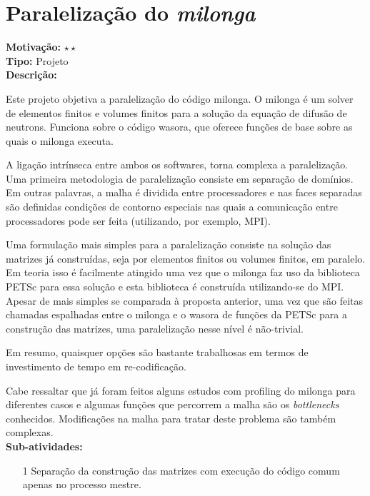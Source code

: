 \chapter{Paralelização do \textit{milonga}}

\textbf{Motivação:} $\star\star$\\

\textbf{Tipo:} Projeto\\

\textbf{Descrição:}

Este projeto objetiva a paralelização do código milonga. O milonga é um solver 
de elementos finitos e volumes finitos para a solução da equação de difusão de 
neutrons. Funciona sobre o código wasora, que oferece funções de base sobre as 
quais o milonga executa.

A ligação intrínseca entre ambos os softwares, torna complexa a paralelização. 
Uma primeira metodologia de paralelização consiste em separação de domínios. 
Em outras palavras, a malha é dividida entre processadores e nas faces separadas 
são definidas condições de contorno especiais nas quais a comunicação entre 
processadores pode ser feita (utilizando, por exemplo, MPI).

Uma formulação mais simples para a paralelização consiste na solução das matrizes 
já construídas, seja por elementos finitos ou volumes finitos, em paralelo. Em 
teoria isso é facilmente atingido uma vez que o milonga faz uso da biblioteca 
PETSc para essa solução e esta biblioteca é construída utilizando-se do MPI. 
Apesar de mais simples se comparada à proposta anterior, uma vez que são feitas 
chamadas espalhadas entre o milonga e o wasora de funções da PETSc para a construção das matrizes, uma paralelização nesse nível é não-trivial.

Em resumo, quaisquer opções são bastante trabalhosas em termos de investimento 
de tempo em re-codificação.

Cabe ressaltar que já foram feitos alguns estudos com profiling do milonga para 
diferentes casos e algumas funções que percorrem a malha são os \textit{bottlenecks} conhecidos. Modificações na malha para tratar deste problema 
são também complexas.\\

\textbf{Sub-atividades:}

\begin{itemize}
	\item[1] Separação da construção das matrizes com execução do código comum 
	apenas no processo mestre.
\end{itemize}

